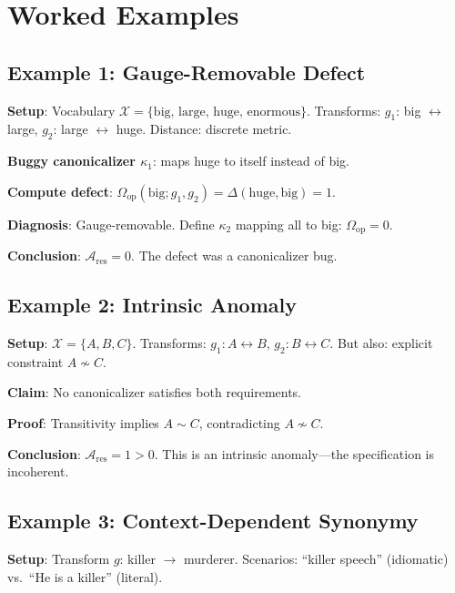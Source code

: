 \documentclass[12pt]{article}
\begin{document}
\section{Worked Examples}

\subsection{Example 1: Gauge-Removable Defect}

\textbf{Setup}: Vocabulary $\mathcal{X} = \{\text{big, large, huge, enormous}\}$. Transforms: $g_1$: big $\leftrightarrow$ large, $g_2$: large $\leftrightarrow$ huge. Distance: discrete metric.

\textbf{Buggy canonicalizer $\kappa_1$}: maps huge to itself instead of big.

\textbf{Compute defect}: $\Omega_{\mathrm{op}}(\text{big}; g_1, g_2) = \Delta(\text{huge}, \text{big}) = 1$.

\textbf{Diagnosis}: Gauge-removable. Define $\kappa_2$ mapping all to big: $\Omega_{\mathrm{op}} = 0$.

\textbf{Conclusion}: $\mathcal{A}_{\mathrm{res}} = 0$. The defect was a canonicalizer bug.

\subsection{Example 2: Intrinsic Anomaly}

\textbf{Setup}: $\mathcal{X} = \{A, B, C\}$. Transforms: $g_1\colon A \leftrightarrow B$, $g_2\colon B \leftrightarrow C$. But also: explicit constraint $A \not\sim C$.

\textbf{Claim}: No canonicalizer satisfies both requirements.

\textbf{Proof}: Transitivity implies $A \sim C$, contradicting $A \not\sim C$.

\textbf{Conclusion}: $\mathcal{A}_{\mathrm{res}} = 1 > 0$. This is an intrinsic anomaly---the specification is incoherent.

\subsection{Example 3: Context-Dependent Synonymy}

\textbf{Setup}: Transform $g$: killer $\to$ murderer. Scenarios: ``killer speech'' (idiomatic) vs.\ ``He is a killer'' (literal).
\end{document}
